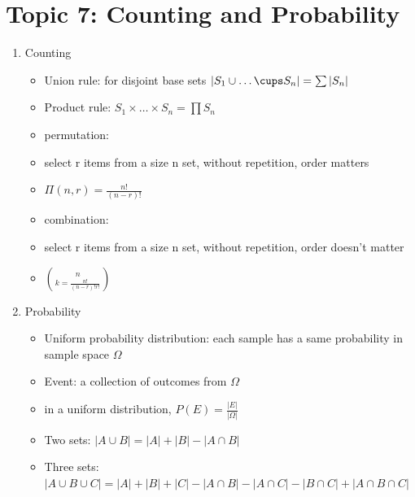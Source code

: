 \documentclass[11pt, a4paper]{article}
\begin{document}
\section*{Topic 7: Counting and Probability}
    \begin{enumerate}
        \item Counting
            \begin{itemize}
                \item Union rule: for disjoint base sets $|S_1 \cup \dots \cups S_n| = \sum {|S_n|}$
                \item Product rule: $S_1 \times \dots \times S_n = \prod {S_n}$ 
                \item permutation: 
                \item select r items from a size n set, without repetition, order matters
                \item $\Pi (n,r) = \frac {n!}{(n-r)!}$
                \item combination:
                \item select r items from a size n set, without repetition, order doesn't matter
                \item $n \choose k = \frac {n!}{(n-r)!r!}$
            \end{itemize}
        \item Probability
            \begin{itemize}
                \item Uniform probability distribution: each sample has a same probability in sample space $\Omega$
                \item Event: a collection of outcomes from $\Omega$
                \item in a uniform distribution, $P(E) = \frac {|E|}{|\Omega|}$
                \item Two sets: $|A \cup B| = |A| + |B| - |A \cap B|$
                \item Three sets: $|A \cup B \cup C| = |A| + |B| + |C| - |A \cap B| -|A \cap C| - |B \cap C| + |A \cap B \cap C|$
            \end{itemize}
    \end{enumerate}


\end{document}
